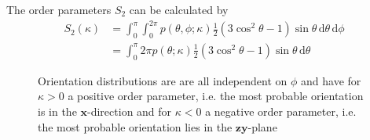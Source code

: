 The order parameters $S_2$ can be calculated by
\begin{align}
S_2(\kappa) &=
\int_0^\pi \int_0^{2\pi}
                p(\theta,\phi;\kappa) \frac12 \left(3\cos^2\theta - 1\right) \sin \theta \, \mathrm{d}\theta\, \mathrm{d}\phi \nonumber \\
&= \int_0^\pi 2\pi
                p(\theta;\kappa) \frac12 \left(3\cos^2\theta - 1\right) \sin \theta \, \mathrm{d}\theta
\label{eq:S2kappa}
\end{align}
\begin{figure}[htb]
\captionsetup[subfigure]{position=b}
\centering
{}
\hfill
{}
\caption{Orientation distributions are are all independent on $\phi$ and have for $\kappa>0$ a positive order parameter, i.e. the most probable orientation is in the $\mathbf{x}$-direction and for $\kappa<0$ a negative order parameter, i.e. the most probable orientation lies in the $\mathbf{zy}$-plane}
\label{fig:pOnsager3D}
\end{figure}

